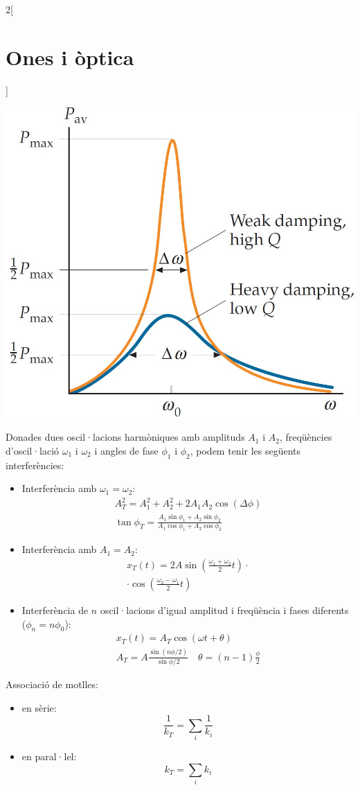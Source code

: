\documentclass[../../../main.tex]{subfiles}
\begin{document}
\begin{multicols}{2}[\section{Ones i òptica}]
\begin{minipage}{\linewidth}
    \includegraphics[width=\linewidth]{Physics/1st/Waves_and_optics/Images/q.jpg}
  \end{minipage}
  Donades dues oscil·lacions harmòniques amb amplituds $A_1$ i $A_2$, freqüències d'oscil·lació $\omega_1$ i $\omega_2$ i angles de fase $\phi_1$ i $\phi_2$, podem tenir les següents interferències:
  \begin{itemize}
    \item Interferència amb $\omega_1=\omega_2$:
          \begin{gather*}
            A_T^2=A_1^2+A_2^2+2A_1A_2\cos(\Delta\phi)\\
            \tan\phi_T=\frac{A_1\sin\phi_1+A_2\sin\phi_2}{A_1\cos\phi_1+A_2\cos\phi_2}
          \end{gather*}
    \item Interferència amb $A_1=A_2$: \begin{multline*}
            x_T(t)=2A\sin\left(\frac{\omega_1+\omega_2}{2}t\right)\cdot\\\cdot\cos\left(\frac{\omega_2-\omega_1}{2}t\right)
          \end{multline*}
    \item Interferència de $n$ oscil·lacions d'igual amplitud i freqüència i fases diferents ($\phi_n=n\phi_0$):
          \begin{gather*}
            x_T(t)=A_T\cos(\omega t+\theta)\\
            A_T=A\frac{\sin(n\phi/2)}{\sin\phi/2}\quad\theta=(n-1)\frac{\phi}{2}
          \end{gather*}
  \end{itemize}
  Associació de motlles:
  \begin{itemize}
    \item en sèrie: $$\frac{1}{k_T}=\sum_i\frac{1}{k_i}$$
    \item en paral·lel: $$k_T=\sum_ik_i$$
  \end{itemize}

\end{multicols}
\end{document}
